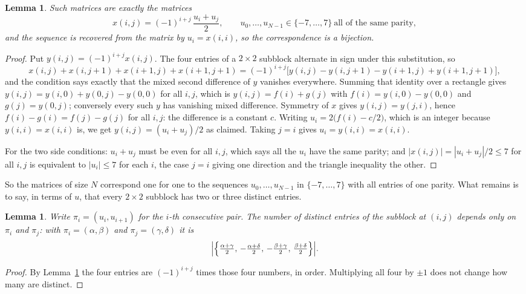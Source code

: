 \documentclass[11pt,a4paper]{article}
\theoremstyle{plain}
\newtheorem{lemma}[theorem]{Lemma}
\theoremstyle{definition}
\begin{document}
\begin{lemma}\label{lem:solve}
Such matrices are exactly the matrices
\[
x(i,j)=(-1)^{i+j}\,\frac{u_i+u_j}{2},
\qquad u_0,\dots,u_{N-1}\in\{-7,\dots,7\}\ \text{all of the same parity},
\]
and the sequence is recovered from the matrix by $u_i=x(i,i)$, so the correspondence is a
bijection.
\end{lemma}

\begin{proof}
Put $y(i,j)=(-1)^{i+j}x(i,j)$. The four entries of a $2\times2$ subblock alternate in sign
under this substitution, so
\[
x(i,j)+x(i,j{+}1)+x(i{+}1,j)+x(i{+}1,j{+}1)
=(-1)^{i+j}\bigl[y(i,j)-y(i,j{+}1)-y(i{+}1,j)+y(i{+}1,j{+}1)\bigr],
\]
and the condition says exactly that the mixed second difference of $y$ vanishes everywhere.
Summing that identity over a rectangle gives
$y(i,j)=y(i,0)+y(0,j)-y(0,0)$ for all $i,j$, which is $y(i,j)=f(i)+g(j)$ with
$f(i)=y(i,0)-y(0,0)$ and $g(j)=y(0,j)$; conversely every such $y$ has vanishing mixed
difference. Symmetry of $x$ gives $y(i,j)=y(j,i)$, hence $f(i)-g(i)=f(j)-g(j)$ for all $i,j$:
the difference is a constant $c$. Writing $u_i=2\bigl(f(i)-c/2\bigr)$, which is an integer
because $y(i,i)=x(i,i)$ is, we get $y(i,j)=(u_i+u_j)/2$ as claimed. Taking $j=i$ gives
$u_i=y(i,i)=x(i,i)$.

For the two side conditions: $u_i+u_j$ must be even for all $i,j$, which says all the $u_i$ have
the same parity; and $|x(i,j)|=|u_i+u_j|/2\le7$ for all $i,j$ is equivalent to $|u_i|\le7$
for each $i$, the case $j=i$ giving one direction and the triangle inequality the other.
\end{proof}

So the matrices of size $N$ correspond one for one to the sequences $u_0,\dots,u_{N-1}$ in
$\{-7,\dots,7\}$ with all entries of one parity. What remains is to say, in terms of $u$,
that every $2\times2$ subblock has two or three distinct entries.

\begin{lemma}\label{lem:block}
Write $\pi_i=(u_i,u_{i+1})$ for the $i$-th consecutive pair. The number of distinct entries of
the subblock at $(i,j)$ depends only on $\pi_i$ and $\pi_j$: with $\pi_i=(\alpha,\beta)$ and
$\pi_j=(\gamma,\delta)$ it is
\[
\Bigl|\Bigl\{\tfrac{\alpha+\gamma}{2},\,-\tfrac{\alpha+\delta}{2},\,
-\tfrac{\beta+\gamma}{2},\,\tfrac{\beta+\delta}{2}\Bigr\}\Bigr| .
\]
\end{lemma}

\begin{proof}
By Lemma~\ref{lem:solve} the four entries are $(-1)^{i+j}$ times those four numbers, in
order. Multiplying all four by $\pm1$ does not change how many are distinct.
\end{proof}
\end{document}
